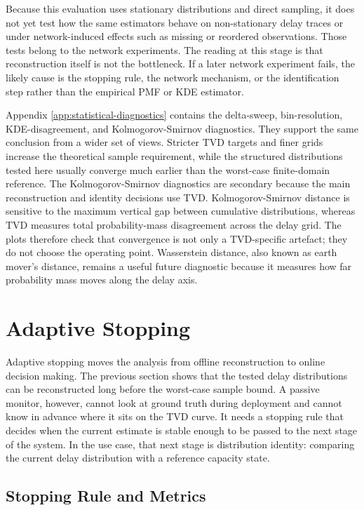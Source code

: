 \documentclass[a4paper,11pt]{report}
\begin{document}
Because this evaluation uses stationary distributions and direct sampling, it does not yet test how the same estimators behave on non-stationary delay traces or under network-induced effects such as missing or reordered observations. Those tests belong to the network experiments. The reading at this stage is that reconstruction itself is not the bottleneck. If a later network experiment fails, the likely cause is the stopping rule, the network mechanism, or the identification step rather than the empirical PMF or KDE estimator.

Appendix \ref{app:statistical-diagnostics} contains the delta-sweep, bin-resolution, KDE-disagreement, and Kolmogorov-Smirnov diagnostics. They support the same conclusion from a wider set of views. Stricter TVD targets and finer grids increase the theoretical sample requirement, while the structured distributions tested here usually converge much earlier than the worst-case finite-domain reference. The Kolmogorov-Smirnov diagnostics are secondary because the main reconstruction and identity decisions use TVD. Kolmogorov-Smirnov distance is sensitive to the maximum vertical gap between cumulative distributions, whereas TVD measures total probability-mass disagreement across the delay grid. The plots therefore check that convergence is not only a TVD-specific artefact; they do not choose the operating point. Wasserstein distance, also known as earth mover's distance, remains a useful future diagnostic because it measures how far probability mass moves along the delay axis.

\clearpage

\chapter{Adaptive Stopping}
\label{sec:eval-adaptive}

Adaptive stopping moves the analysis from offline reconstruction to online decision making. The previous section shows that the tested delay distributions can be reconstructed long before the worst-case sample bound. A passive monitor, however, cannot look at ground truth during deployment and cannot know in advance where it sits on the TVD curve. It needs a stopping rule that decides when the current estimate is stable enough to be passed to the next stage of the system. In the use case, that next stage is distribution identity: comparing the current delay distribution with a reference capacity state.

\section{Stopping Rule and Metrics}
\end{document}
